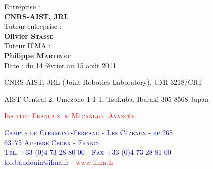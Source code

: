 \documentclass[a4paper,oneside,12pt]{article}
\newcommand{\olivier}{Olivier S\textsc{tasse}\xspace}
\newcommand{\philippe}{Philippe M\textsc{artinet}\xspace}
\begin{document}
\begin{flushright}
\begin{large}
Entreprise :\\

\textbf{CNRS-AIST, JRL}\\

\vspace{3mm}
Tuteur entreprise :\\

\textbf{\olivier}\\

\vspace{3mm}
Tuteur IFMA :\\

\textbf{\philippe}\\

\vspace{3mm}
Date : du 14 février au 15 ao\^ut 2011
\end{large}
\end{flushright}

\vspace{5mm}
\begin{flushright}
CNRS-AIST, JRL (Joint Robotics Laboratory),
UMI 3218/CRT\\
\begin{footnotesize}
AIST Central 2, Umezono 1-1-1,
Tsukuba, Ibaraki 305-8568 Japan\\
\end{footnotesize}
\vspace{2mm}

\textcolor{red}{I\textsc{nstitut} F\textsc{ran\c{c}ais de} M\textsc{\'ecanique} A\textsc{vanc\'ee}}\\
\begin{footnotesize}
\textcolor{blue}{C\textsc{ampus de} C\textsc{lermont}-F\textsc{errand} - L\textsc{es} C\textsc{\'ezeaux} - \textsc{bp} 265\\
63175 A\textsc{ubi\`ere} C\textsc{edex} - F\textsc{rance}}\\
\textcolor{blue}{T\textsc{el}. +33 (0)4 73 28 80 00 - F\textsc{ax} +33 (0)4 73 28 81 00\\
leo.baudouin@ifma.fr -} \textcolor{red}{www.ifma.fr}\\
\end{footnotesize}
\end{flushright}
\end{document}
